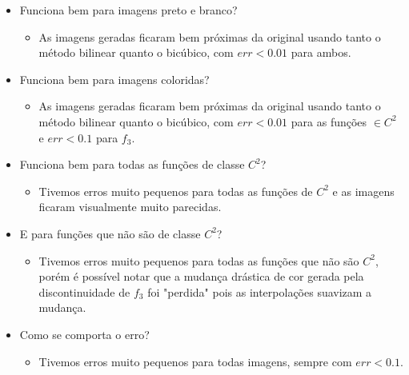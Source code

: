 \documentclass[12pt, a4paper]{article}
\begin{document}
    \begin{itemize}
        \item Funciona bem para imagens preto e branco?
        \begin{itemize}
            \item As imagens geradas ficaram bem próximas da original usando tanto
            o método bilinear quanto o bicúbico, com $err < 0.01$ para ambos.
        \end{itemize}
        \item Funciona bem para imagens coloridas?
        \begin{itemize}
            \item As imagens geradas ficaram bem próximas da original usando tanto
            o método bilinear quanto o bicúbico, com $err < 0.01$ para as funções
            $\in C^2$ e $err < 0.1$ para $f_3$.
        \end{itemize}
        \item Funciona bem para todas as funções de classe $C^2$?
        \begin{itemize}
            \item Tivemos erros muito pequenos para todas as funções de $C^2$ e
            as imagens ficaram visualmente muito parecidas.
        \end{itemize}
        \item E para funções que não são de classe $C^2$?
        \begin{itemize}
            \item Tivemos erros muito pequenos para todas as funções que não são
            $C^2$, porém é possível notar que a mudança drástica de cor gerada pela
            discontinuidade de $f_3$ foi "perdida" pois as interpolações suavizam
            a mudança.
        \end{itemize}
        \item Como se comporta o erro?
        \begin{itemize}
            \item Tivemos erros muito pequenos para todas imagens, sempre com $err < 0.1$.
        \end{itemize}
    \end{itemize}
\end{document}

